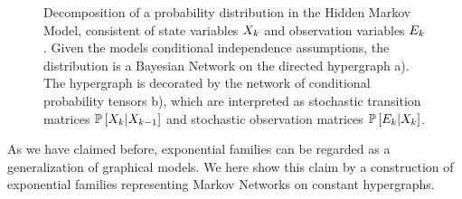 \begin{figure}[t!]
    \begin{center}
        
    \end{center}
    \caption{Decomposition of a probability distribution in the Hidden Markov Model, consistent of state variables $X_{k}$ and observation variables $E_{k}$.
    Given the models conditional independence assumptions, the distribution is a Bayesian Network on the directed hypergraph a).
    The hypergraph is decorated by the network of conditional probability tensors b), which are interpreted as stochastic transition matrices $\mathbb{P}\left[X_{k}|X_{k-1}\right]$ and stochastic observation matrices $\mathbb{P}\left[E_{k}|X_{k}\right]$.
    }
    \label{fig:HMM}
\end{figure}





As we have claimed before, exponential families can be regarded as a generalization of graphical models.
We here show this claim by a construction of exponential families representing Markov Networks on constant hypergraphs.

